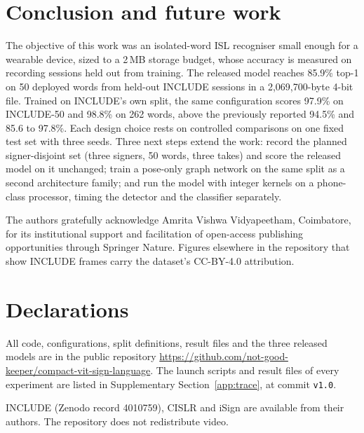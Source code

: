 \documentclass[pdflatex,sn-mathphys-num,twocolumn,lineno]{sn-jnl}
\theoremstyle{thmstyleone}%
\begin{document}
\section{Conclusion and future work}\label{sec:conclusion}

The objective of this work was an isolated-word ISL recogniser small enough for a wearable device, sized to a 2\,MB storage budget, whose accuracy is measured on recording sessions held out from training. The released model reaches 85.9\% top-1 on 50 deployed words from held-out INCLUDE sessions in a 2,069,700-byte 4-bit file. Trained on INCLUDE's own split, the same configuration scores 97.9\% on INCLUDE-50 and 98.8\% on 262 words, above the previously reported 94.5\% and 85.6 to 97.8\%. Each design choice rests on controlled comparisons on one fixed test set with three seeds. Three next steps extend the work: record the planned signer-disjoint set (three signers, 50 words, three takes) and score the released model on it unchanged; train a pose-only graph network on the same split as a second architecture family; and run the model with integer kernels on a phone-class processor, timing the detector and the classifier separately.

\backmatter

The authors gratefully acknowledge Amrita Vishwa Vidyapeetham, Coimbatore, for its institutional support and facilitation of open-access publishing opportunities through Springer Nature. Figures elsewhere in the repository that show INCLUDE frames carry the dataset's CC-BY-4.0 attribution.

\section*{Declarations}

All code, configurations, split definitions, result files and the three released models are in the public repository \url{https://github.com/not-good-keeper/compact-vit-sign-language}. The launch scripts and result files of every experiment are listed in Supplementary Section~\ref{app:trace}, at commit \texttt{v1.0}.

INCLUDE (Zenodo record 4010759), CISLR and iSign are available from their authors. The repository does not redistribute video.
\end{document}
